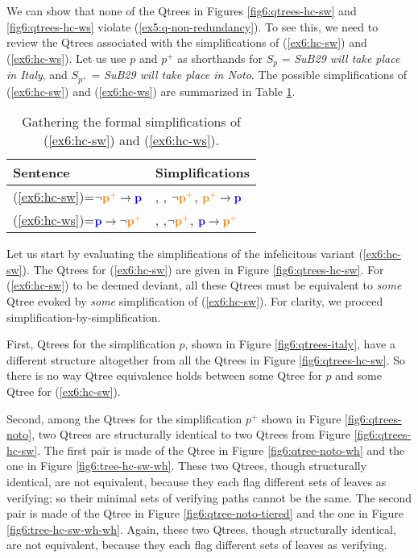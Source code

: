 We can show that none of the Qtrees in Figures \ref{fig6:qtrees-hc-sw} and \ref{fig6:qtrees-hc-ws} violate (\ref{ex5:q-non-redundancy}). To see this, we need to review the Qtrees associated with the simplifications of (\ref{ex6:hc-sw}) and (\ref{ex6:hc-ws}). Let us use $p$ and $p^+$ as shorthands for $S_p$ = \textit{SuB29 will take place in Italy}, and $S_{p^+}$ = \textit{SuB29 will take place in Noto}. The possible simplifications of (\ref{ex6:hc-sw}) and (\ref{ex6:hc-ws}) are summarized in Table \ref{tab6:hc-simplifications}.

\begin{table}[H]
	\centering
	\begin{tabular}{ll}
		\toprule
		Sentence & Simplifications                                             \\ \midrule
		(\ref{ex6:hc-sw})=$\neg\textbf{\textcolor{orange}{p$^+$}}\rightarrow\textbf{\textcolor{blue}{p}}$     & \p, \pplus, $\neg\textbf{\textcolor{orange}{p$^+$}}$, $\textbf{\textcolor{orange}{p$^+$}}\rightarrow\textbf{\textcolor{blue}{p}}$\\
		(\ref{ex6:hc-ws})=$\textbf{\textcolor{blue}{p}}\rightarrow\neg\textbf{\textcolor{orange}{p$^+$}}$     & \p, \pplus,$\neg\textbf{\textcolor{orange}{p$^+$}}$, $\textbf{\textcolor{blue}{p}}\rightarrow\textbf{\textcolor{orange}{p$^+$}}$\\\bottomrule            
	\end{tabular}
	\caption[]{Gathering the formal simplifications of (\ref{ex6:hc-sw}) and (\ref{ex6:hc-ws}).}\label{tab6:hc-simplifications}
\end{table}


Let us start by evaluating the simplifications of the infelicitous variant (\ref{ex6:hc-sw}). The Qtrees for (\ref{ex6:hc-sw}) are given in Figure \ref{fig6:qtrees-hc-sw}. For (\ref{ex6:hc-sw}) to be deemed deviant, all these Qtrees must be equivalent to \textit{some} Qtree evoked by \textit{some} simplification of (\ref{ex6:hc-sw}). For clarity, we proceed simplification-by-simplification.

First, Qtrees for the simplification $p$, shown in Figure \ref{fig6:qtrees-italy}, have a different structure altogether from all the Qtrees in Figure \ref{fig6:qtrees-hc-sw}. So there is no way Qtree equivalence holds between some Qtree for $p$ and some Qtree for (\ref{ex6:hc-sw}).

Second, among the Qtrees for the simplification $p^+$ shown in Figure \ref{fig6:qtrees-noto}, two Qtrees are structurally identical to two Qtrees from Figure \ref{fig6:qtrees-hc-sw}. The first pair is made of the Qtree in Figure \ref{fig6:qtree-noto-wh} and the one in Figure \ref{fig6:tree-hc-sw-wh}. These two Qtrees, though structurally identical, are not equivalent, because they each flag different sets of leaves as verifying; so their minimal sets of verifying paths cannot be the same. The second pair is made of the Qtree in Figure \ref{fig6:qtree-noto-tiered} and the one in Figure \ref{fig6:tree-hc-sw-wh-wh}. Again, these two Qtrees, though structurally identical, are not equivalent, because they each flag different sets of leaves as verifying.

